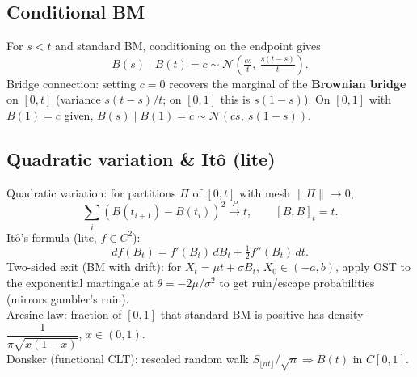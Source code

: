 \subsection{Conditional BM}
For $s<t$ and standard BM, conditioning on the endpoint gives
\[B(s)\mid B(t)=c\sim\mathcal{N}\!\left(\tfrac{cs}{t},\ \tfrac{s(t-s)}{t}\right).\]
\textcolor{Bittersweet}{Bridge connection}: setting $c=0$ recovers the
marginal of the \textbf{Brownian bridge} on $[0,t]$ (variance $s(t-s)/t$;
on $[0,1]$ this is $s(1-s)$). On $[0,1]$ with $B(1)=c$ given,
$B(s)\mid B(1)=c\sim\mathcal{N}(cs,\ s(1-s))$.

\subsection{Quadratic variation \& It\^o (lite)}
\textcolor{Bittersweet}{Quadratic variation}: for partitions $\Pi$ of $[0,t]$ with
mesh $\|\Pi\|\to 0$,
\[\sum_i(B(t_{i+1})-B(t_i))^2\xrightarrow{P}t,\qquad [B,B]_t=t.\]
\textcolor{Bittersweet}{It\^o's formula} (lite, $f\in C^2$):
\[df(B_t)=f'(B_t)\,dB_t+\tfrac{1}{2}f''(B_t)\,dt.\]
\textcolor{Bittersweet}{Two-sided exit (BM with drift)}: for $X_t=\mu t+\sigma B_t$,
$X_0\in(-a,b)$, apply OST to the exponential martingale at $\theta=-2\mu/\sigma^2$
to get ruin/escape probabilities (mirrors gambler's ruin).\\
\textcolor{Bittersweet}{Arcsine law}: fraction of $[0,1]$ that standard BM is
positive has density $\dfrac{1}{\pi\sqrt{x(1-x)}}$, $x\in(0,1)$.\\
\textcolor{Bittersweet}{Donsker (functional CLT)}: rescaled random walk
$S_{\lfloor nt\rfloor}/\sqrt n\Rightarrow B(t)$ in $C[0,1]$.
